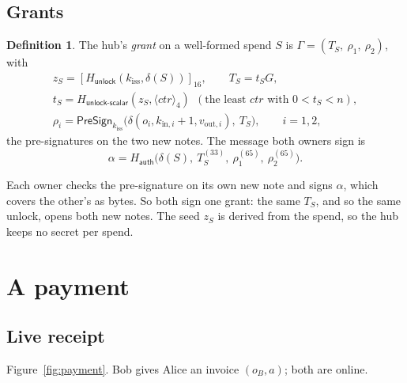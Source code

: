 \documentclass[11pt]{article}
\theoremstyle{plain}
\theoremstyle{definition}
\newtheorem{definition}{Definition}
\newcommand{\be}[2]{\langle #1\rangle_{#2}}
\newcommand{\pre}[2]{[#1]_{#2}}
\newcommand{\Ht}[1]{H_{\textsf{#1}}}
\newcommand{\PSign}{\mathsf{PreSign}}
\newcommand{\kiss}{k_{\mathrm{iss}}}
\begin{document}
\subsection{Grants}\label{sec:grant}

\begin{definition}
The hub's \emph{grant} on a well-formed spend $S$ is $\Gamma = (T_S,\
\rho_1,\ \rho_2)$, with
\begin{gather*}
  z_S = \pre{\Ht{unlock}(\kiss, \delta(S))}{16},\qquad T_S = t_S G,\\
  t_S = \Ht{unlock-scalar}(z_S, \be{\mathit{ctr}}{4})\ \ (\text{the least
  } \mathit{ctr} \text{ with } 0 < t_S < n),\\
  \rho_i = \PSign_{\kiss}\big(\delta(o_i, k_{\mathrm{in},i} + 1,
  v_{\mathrm{out},i}),\ T_S\big),\qquad i = 1, 2,
\end{gather*}
the pre-signatures on the two new notes. The message both owners sign is
\[
  \alpha = \Ht{auth}\big(\delta(S),\ T_S^{(33)},\ \rho_1^{(65)},\
  \rho_2^{(65)}\big).
\]
\end{definition}

Each owner checks the pre-signature on its own new note and signs
$\alpha$, which covers the other's as bytes. So both sign one grant:
the same $T_S$, and so the same unlock, opens both new notes. The seed
$z_S$ is derived from the spend, so the hub keeps no secret per spend.

\section{A payment}\label{sec:payment}

\subsection{Live receipt}\label{sec:live}

Figure~\ref{fig:payment}. Bob gives Alice an invoice $(o_B, a)$; both
are online.
\end{document}

